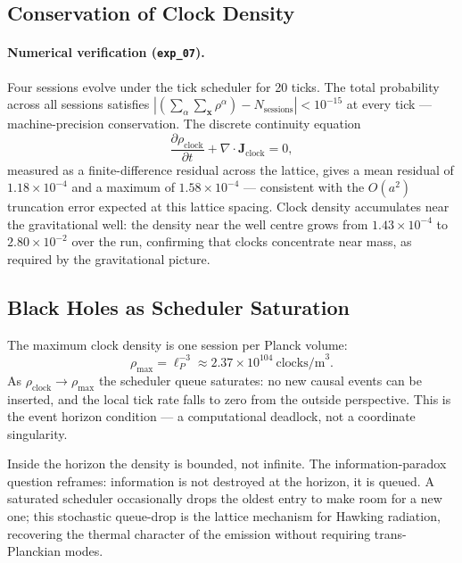 \subsection{Conservation of Clock Density}
\label{subsec:clock_conservation}

\paragraph{Numerical verification (\texttt{exp\_07}).}
Four sessions evolve under the tick scheduler for 20 ticks.
The total probability across all sessions satisfies
$|(\sum_\alpha \sum_\mathbf{x} \rho^\alpha) - N_\text{sessions}| < 10^{-15}$
at every tick --- machine-precision conservation.
The discrete continuity equation
\begin{equation}
    \frac{\partial \rho_\text{clock}}{\partial t}
        + \nabla \cdot \mathbf{J}_\text{clock} = 0,
    \label{eq:continuity}
\end{equation}
measured as a finite-difference residual across the lattice, gives a
mean residual of $1.18 \times 10^{-4}$ and a maximum of
$1.58 \times 10^{-4}$ --- consistent with the $O(a^2)$ truncation error
expected at this lattice spacing.
Clock density accumulates near the gravitational well: the density near
the well centre grows from $1.43 \times 10^{-4}$ to $2.80 \times 10^{-2}$
over the run, confirming that clocks concentrate near mass, as required
by the gravitational picture.

\subsection{Black Holes as Scheduler Saturation}
\label{subsec:black_holes}

The maximum clock density is one session per Planck volume:
\begin{equation}
    \rho_\text{max} = \ell_P^{-3}
        \approx 2.37 \times 10^{104}\ \text{clocks/m}^3.
    \label{eq:rho_max}
\end{equation}
As $\rho_\text{clock} \to \rho_\text{max}$ the scheduler queue saturates:
no new causal events can be inserted, and the local tick rate falls to
zero from the outside perspective.
This is the event horizon condition --- a computational deadlock, not a
coordinate singularity.

Inside the horizon the density is bounded, not infinite.
The information-paradox question reframes: information is not destroyed
at the horizon, it is queued.
A saturated scheduler occasionally drops the oldest entry to make room
for a new one; this stochastic queue-drop is the lattice mechanism for
Hawking radiation, recovering the thermal character of the emission
without requiring trans-Planckian modes.

